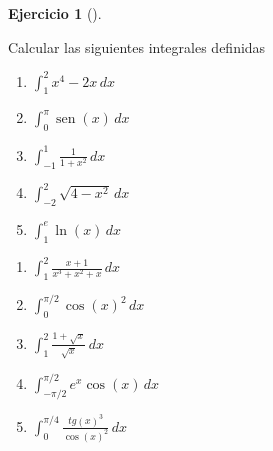 \documentclass[
  a4paper,
]{scrreport}
\theoremstyle{definition}
\newtheorem{exercise}{Ejercicio}[chapter]
\theoremstyle{remark}
\begin{document}
\begin{exercise}[]\protect\hypertarget{exr-integrales-definidas}{}\label{exr-integrales-definidas}

Calcular las siguientes integrales definidas

\begin{enumerate}
\def\labelenumi{\alph{enumi}.}
\item
  \(\int_1^2 x^4-2x\,dx\)
\item
  \(\int_0^{\pi} \operatorname{sen}(x)\, dx\)
\item
  \(\int_{-1}^1 \frac{1}{1+x^2}\,dx\)
\item
  \(\int_{-2}^2 \sqrt{4-x^2}\,dx\)
\item
  \(\int_1^e \ln(x)\,dx\)
\end{enumerate}

\begin{enumerate}
\def\labelenumi{\alph{enumi}.}
\setcounter{enumi}{5}
\item
  \(\int_1^2 \frac{x+1}{x^3+x^2+x}\,dx\)
\item
  \(\int_0^{\pi/2} \cos(x)^2\, dx\)
\item
  \(\int_1^2 \frac{1+\sqrt{x}}{\sqrt{x}}\,dx\)
\item
  \(\int_{-\pi/2}^{\pi/2} e^x\cos(x)\,dx\)
\item
  \(\int_{0}^{\pi/4}\frac{tg(x)^3}{\cos(x)^2}\,dx\)
\end{enumerate}

\end{exercise}
\end{document}
